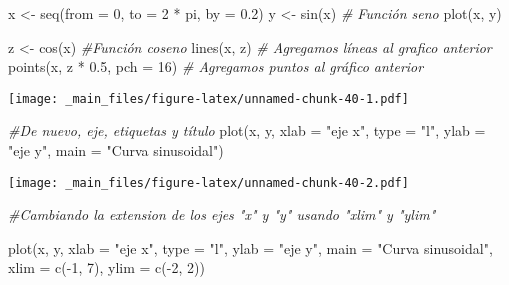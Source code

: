\documentclass[
]{book}
\newenvironment{Shaded}{\begin{snugshade}}{\end{snugshade}}
\newcommand{\AttributeTok}[1]{\textcolor[rgb]{0.77,0.63,0.00}{#1}}
\newcommand{\CommentTok}[1]{\textcolor[rgb]{0.56,0.35,0.01}{\textit{#1}}}
\newcommand{\DecValTok}[1]{\textcolor[rgb]{0.00,0.00,0.81}{#1}}
\newcommand{\FloatTok}[1]{\textcolor[rgb]{0.00,0.00,0.81}{#1}}
\newcommand{\FunctionTok}[1]{\textcolor[rgb]{0.00,0.00,0.00}{#1}}
\newcommand{\NormalTok}[1]{#1}
\newcommand{\OtherTok}[1]{\textcolor[rgb]{0.56,0.35,0.01}{#1}}
\newcommand{\SpecialCharTok}[1]{\textcolor[rgb]{0.00,0.00,0.00}{#1}}
\newcommand{\StringTok}[1]{\textcolor[rgb]{0.31,0.60,0.02}{#1}}
\begin{document}
\begin{Shaded}
\begin{Highlighting}[]
\NormalTok{x }\OtherTok{\textless{}{-}} \FunctionTok{seq}\NormalTok{(}\AttributeTok{from =} \DecValTok{0}\NormalTok{, }\AttributeTok{to =} \DecValTok{2} \SpecialCharTok{*}\NormalTok{ pi, }\AttributeTok{by =} \FloatTok{0.2}\NormalTok{)}
\NormalTok{y }\OtherTok{\textless{}{-}} \FunctionTok{sin}\NormalTok{(x) }\CommentTok{\# Función seno}
\FunctionTok{plot}\NormalTok{(x, y)}

\NormalTok{z }\OtherTok{\textless{}{-}} \FunctionTok{cos}\NormalTok{(x) }\CommentTok{\#Función coseno}
\FunctionTok{lines}\NormalTok{(x, z)  }\CommentTok{\# Agregamos líneas al grafico anterior }
\FunctionTok{points}\NormalTok{(x, z }\SpecialCharTok{*} \FloatTok{0.5}\NormalTok{, }\AttributeTok{pch =} \DecValTok{16}\NormalTok{) }\CommentTok{\# Agregamos puntos al gráfico anterior }
\end{Highlighting}
\end{Shaded}

\texttt{[image: \_main\_files/figure-latex/unnamed-chunk-40-1.pdf]}

\begin{Shaded}
\begin{Highlighting}[]
\CommentTok{\#De nuevo, eje, etiquetas y título }
\FunctionTok{plot}\NormalTok{(x, y, }\AttributeTok{xlab =} \StringTok{"eje x"}\NormalTok{, }\AttributeTok{type =} \StringTok{"l"}\NormalTok{, }\AttributeTok{ylab =} \StringTok{"eje y"}\NormalTok{, }\AttributeTok{main =} \StringTok{"Curva sinusoidal"}\NormalTok{)}
\end{Highlighting}
\end{Shaded}

\texttt{[image: \_main\_files/figure-latex/unnamed-chunk-40-2.pdf]}

\begin{Shaded}
\begin{Highlighting}[]
\CommentTok{\#Cambiando la extension de los ejes "x" y "y" usando "xlim" y "ylim"}

\FunctionTok{plot}\NormalTok{(x, y, }\AttributeTok{xlab =} \StringTok{"eje x"}\NormalTok{, }\AttributeTok{type =} \StringTok{"l"}\NormalTok{, }\AttributeTok{ylab =} \StringTok{"eje y"}\NormalTok{, }\AttributeTok{main =} \StringTok{"Curva sinusoidal"}\NormalTok{, }
     \AttributeTok{xlim =} \FunctionTok{c}\NormalTok{(}\SpecialCharTok{{-}}\DecValTok{1}\NormalTok{, }\DecValTok{7}\NormalTok{), }\AttributeTok{ylim =} \FunctionTok{c}\NormalTok{(}\SpecialCharTok{{-}}\DecValTok{2}\NormalTok{, }\DecValTok{2}\NormalTok{))}
\end{Highlighting}
\end{Shaded}
\end{document}
